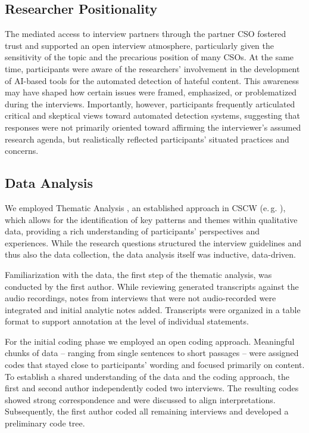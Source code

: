 \documentclass[acmsmall]{acmart}
\begin{document}
\subsection{Researcher Positionality}
The mediated access to interview partners through the partner CSO fostered trust and supported an open interview atmosphere, particularly given the sensitivity of the topic and the precarious position of many CSOs. At the same time, participants were aware of the researchers' involvement in the development of AI-based tools for the automated detection of hateful content. This awareness may have shaped how certain issues were framed, emphasized, or problematized during the interviews. Importantly, however, participants frequently articulated critical and skeptical views toward automated detection systems, suggesting that responses were not primarily oriented toward affirming the interviewer's assumed research agenda, but realistically reflected participants' situated practices and concerns.

\subsection{Data Analysis}
We employed Thematic Analysis \cite{braun_using_2006}, an established approach in CSCW (e.\,g. \cite{seering_chillbot_2024,schluger_proactive_2022,mukhopadhyay_osint_2024}), which allows for the identification of key patterns and themes within qualitative data, providing a rich understanding of participants' perspectives and experiences. While the research questions structured the interview guidelines and thus also the data collection, the data analysis itself was inductive, data-driven. 

Familiarization with the data, the first step of the thematic analysis, was conducted by the first author. While reviewing generated transcripts against the audio recordings, notes from interviews that were not audio-recorded were integrated and initial analytic notes added. Transcripts were organized in a table format to support annotation at the level of individual statements.

For the initial coding phase we employed an open coding approach. Meaningful chunks of data -- ranging from single sentences to short passages -- were assigned codes that stayed close to participants' wording and focused primarily on content. To establish a shared understanding of the data and the coding approach, the first and second author independently coded two interviews. The resulting codes showed strong correspondence and were discussed to align interpretations. Subsequently, the first author coded all remaining interviews and developed a preliminary code tree. 
\end{document}
